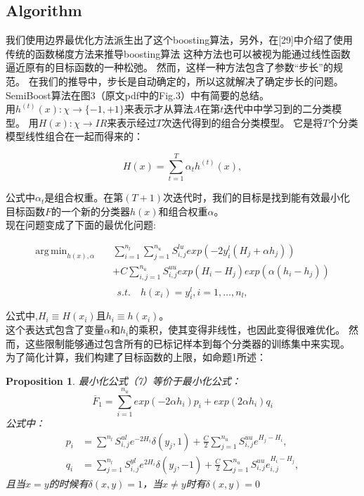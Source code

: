 \documentclass[10pt,journal,compsoc]{IEEEtran}
\DeclareMathOperator*{\argmin}{arg\,min} %
\newtheorem{prop}{Proposition}
\begin{document}
\subsection{Algorithm}
我们使用边界最优化方法派生出了这个boosting算法，另外，在[29]中介绍了使用传统的函数梯度方法来推导boosting算法
这种方法也可以被视为能通过线性函数逼近原有的目标函数的一种松弛。
然而，这样一种方法包含了参数“步长”的规范。
在我们的推导中，步长是自动确定的，所以这就解决了确定步长的问题。
SemiBoost算法在图3（原文pdf中的Fig.3）中有简要的总结。\\
用$h^{(t)}(x):\chi \rightarrow \{-1, +1\}$来表示才从算法$A$在第$t$迭代中中学习到的二分类模型。
用$H(x):\chi\rightarrow IR$来表示经过$T$次迭代得到的组合分类模型。
它是将$T$个分类模型线性组合在一起而得来的：
\begin{center}
\[ H(x)=\sum^T_{t=1}\alpha_th^{(t)}(x), \]
\end{center}
公式中$\alpha_t$是组合权重。在第$(T+1)$次迭代时，我们的目标是找到能有效最小化目标函数$F$的一个新的分类器$h(x)$和组合权重$\alpha$。\\
现在问题变成了下面的最优化问题:
\begin{center}
\begin{equation}
\begin{split}
\argmin_{h(x),\alpha}\quad &\sum^{n_l}_{i=1}\sum^{n_u}_{j=1}S^{lu}_{i,j}exp(-2y^l_i(H_j+\alpha h_j))\\
&+C\sum^{n_u}_{i,j=1}S^{uu}_{i,j}exp(H_i-H_j)exp(\alpha(h_i-h_j)) \\
\end{split}
\end{equation}
\begin{equation}
s.t.\quad h(x_i) = y^l_i,i=1,\ldots,n_l, 
\end{equation}
\end{center}
公式中,$H_i\equiv H(x_i)$且$h_i\equiv h(x_i)$。\\
这个表达式包含了变量$\alpha$和$h_i$的乘积，使其变得非线性，也因此变得很难优化。
然而，这些限制能够通过包含所有的已标记样本到每个分类器的训练集中来实现。
为了简化计算，我们构建了目标函数的上限，如命题1所述：
\begin{prop}
最小化公式（7）等价于最小化公式：
\begin{equation}
\overline{F}_1=\sum^{n_u}_{i=1}exp(-2\alpha h_i)p_i+exp(2\alpha h_i)q_i
\end{equation}
公式中：
\begin{align}
p_i &= \sum^{n_l}S^{ul}_{i,j}e^{-2H_i}\delta(y_j,1)+\frac{C}{2}\sum^{n_u}_{j=1}S^{uu}_{i,j}e^{H_j-H_i},\\
q_i &= \sum^{n_l}_{j=1}S^{yl}_{i,j}e^{2H_i}\delta(y_j,-1)+\frac{C}{2}\sum^{n_u}_{j=1}S^{uu}_{i,j}e^{H_i-H_j}_{i,j},
\end{align}
且当$x=y$的时候有$\delta(x,y)=1$，当$x\neq y$时有$\delta(x,y)=0$
\end{prop}
\end{document}
